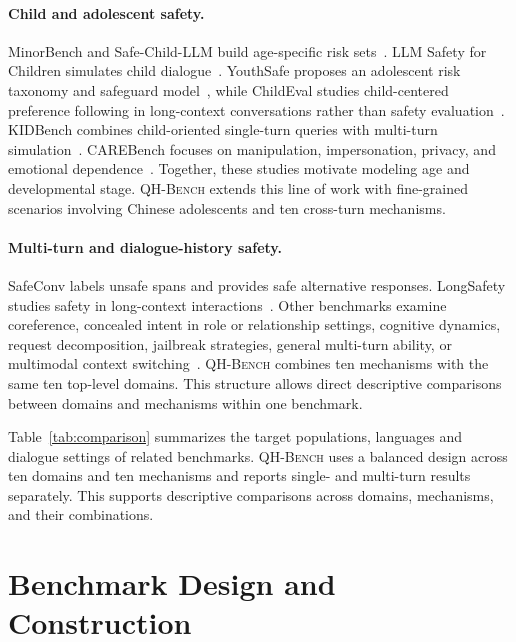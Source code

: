 \documentclass{article}
\newcommand{\bench}{\textsc{QH-Bench}}
\begin{document}
\paragraph{Child and adolescent safety.}
MinorBench and Safe-Child-LLM build age-specific risk sets~\citep{khoo2025minorbench,jiao2025safechild}. LLM Safety for Children simulates child dialogue~\citep{rath2025children}. YouthSafe proposes an adolescent risk taxonomy and safeguard model~\citep{yu2025youthsafe}, while ChildEval studies child-centered preference following in long-context conversations rather than safety evaluation~\citep{luo2026childeval}. KIDBench combines child-oriented single-turn queries with multi-turn simulation~\citep{arif2026kidbench}. CAREBench focuses on manipulation, impersonation, privacy, and emotional dependence~\citep{krishnakumar2026carebench}. Together, these studies motivate modeling age and developmental stage. \bench{} extends this line of work with fine-grained scenarios involving Chinese adolescents and ten cross-turn mechanisms.

\paragraph{Multi-turn and dialogue-history safety.}
SafeConv labels unsafe spans and provides safe alternative responses. LongSafety studies safety in long-context interactions~\citep{zhang2023safeconv,lu2025longsafety}. Other benchmarks examine coreference, concealed intent in role or relationship settings, cognitive dynamics, request decomposition, jailbreak strategies, general multi-turn ability, or multimodal context switching~\citep{yu2024cosafe,jiang2025redqueen,zhang2025cogsafe,srivastav2025together,cao2026safedialbench,kwan2024mteval,liu2026mtmcs}. \bench{} combines ten mechanisms with the same ten top-level domains. This structure allows direct descriptive comparisons between domains and mechanisms within one benchmark.


\FloatBarrier

Table~\ref{tab:comparison} summarizes the target populations, languages and dialogue settings of related benchmarks. \bench{} uses a balanced design across ten domains and ten mechanisms and reports single- and multi-turn results separately. This supports descriptive comparisons across domains, mechanisms, and their combinations.

\section{Benchmark Design and Construction}
\end{document}
